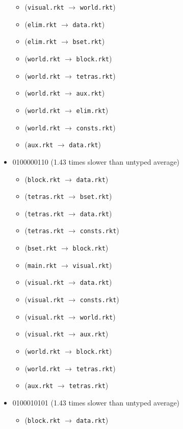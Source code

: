 \documentclass{article}
\newcommand{\mono}[1]{\texttt{#1}}
\begin{document}
\begin{itemize}
\begin{itemize}
  \item (\mono{visual.rkt} $\rightarrow$ \mono{world.rkt})
  \item (\mono{elim.rkt} $\rightarrow$ \mono{data.rkt})
  \item (\mono{elim.rkt} $\rightarrow$ \mono{bset.rkt})
  \item (\mono{world.rkt} $\rightarrow$ \mono{block.rkt})
  \item (\mono{world.rkt} $\rightarrow$ \mono{tetras.rkt})
  \item (\mono{world.rkt} $\rightarrow$ \mono{aux.rkt})
  \item (\mono{world.rkt} $\rightarrow$ \mono{elim.rkt})
  \item (\mono{world.rkt} $\rightarrow$ \mono{consts.rkt})
  \item (\mono{aux.rkt} $\rightarrow$ \mono{data.rkt})
  \end{itemize}
\item 0100000110 (1.43 times slower than untyped average)
  \begin{itemize}
  \item (\mono{block.rkt} $\rightarrow$ \mono{data.rkt})
  \item (\mono{tetras.rkt} $\rightarrow$ \mono{bset.rkt})
  \item (\mono{tetras.rkt} $\rightarrow$ \mono{data.rkt})
  \item (\mono{tetras.rkt} $\rightarrow$ \mono{consts.rkt})
  \item (\mono{bset.rkt} $\rightarrow$ \mono{block.rkt})
  \item (\mono{main.rkt} $\rightarrow$ \mono{visual.rkt})
  \item (\mono{visual.rkt} $\rightarrow$ \mono{data.rkt})
  \item (\mono{visual.rkt} $\rightarrow$ \mono{consts.rkt})
  \item (\mono{visual.rkt} $\rightarrow$ \mono{world.rkt})
  \item (\mono{visual.rkt} $\rightarrow$ \mono{aux.rkt})
  \item (\mono{world.rkt} $\rightarrow$ \mono{block.rkt})
  \item (\mono{world.rkt} $\rightarrow$ \mono{tetras.rkt})
  \item (\mono{aux.rkt} $\rightarrow$ \mono{tetras.rkt})
  \end{itemize}
\item 0100010101 (1.43 times slower than untyped average)
  \begin{itemize}
  \item (\mono{block.rkt} $\rightarrow$ \mono{data.rkt})

\end{itemize}
\end{itemize}
\end{document}
